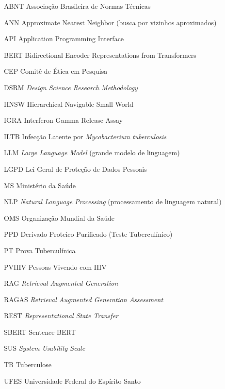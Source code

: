 \documentclass[
  12pt,
  oneside,
  a4paper,
  english,
  brazil
]{abntex2}
\begin{document}
\begin{siglas}
  \item[ABNT]   Associação Brasileira de Normas Técnicas
  \item[ANN]    Approximate Nearest Neighbor (busca por vizinhos aproximados)
  \item[API]    Application Programming Interface
  \item[BERT]   Bidirectional Encoder Representations from Transformers
  \item[CEP]    Comitê de Ética em Pesquisa
  \item[DSRM]   \textit{Design Science Research Methodology}
  \item[HNSW]   Hierarchical Navigable Small World
  \item[IGRA]   Interferon-Gamma Release Assay
  \item[ILTB]   Infecção Latente por \textit{Mycobacterium tuberculosis}
  \item[LLM]    \textit{Large Language Model} (grande modelo de linguagem)
  \item[LGPD]   Lei Geral de Proteção de Dados Pessoais
  \item[MS]     Ministério da Saúde
  \item[NLP]    \textit{Natural Language Processing} (processamento de linguagem natural)
  \item[OMS]    Organização Mundial da Saúde
  \item[PPD]    Derivado Proteico Purificado (Teste Tuberculínico)
  \item[PT]     Prova Tuberculínica
  \item[PVHIV]  Pessoas Vivendo com HIV
  \item[RAG]    \textit{Retrieval-Augmented Generation}
  \item[RAGAS]  \textit{Retrieval Augmented Generation Assessment}
  \item[REST]   \textit{Representational State Transfer}
  \item[SBERT]  Sentence-BERT
  \item[SUS]    \textit{System Usability Scale}
  \item[TB]     Tuberculose
  \item[UFES]   Universidade Federal do Espírito Santo
\end{siglas}

\tableofcontents*
\cleardoublepage
\end{document}
